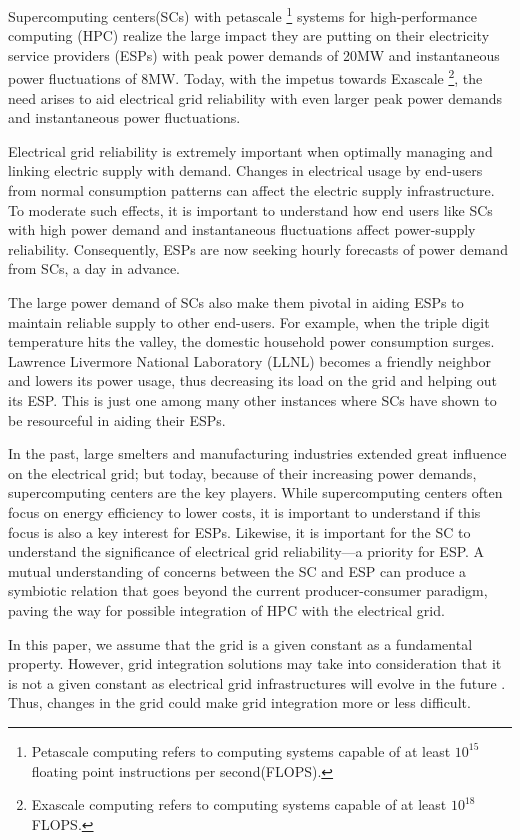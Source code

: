 Supercomputing centers(SCs) with petascale
\footnote{Petascale computing refers to computing systems capable of at
least \(10^{15}\) floating point instructions per second(FLOPS).} 
systems for high-performance computing (HPC) realize the large 
impact they are putting on their electricity service providers (ESPs) with peak 
power demands of 20MW and instantaneous power fluctuations of 8MW. 
Today, with the impetus towards Exascale
\footnote{Exascale computing refers to computing systems capable of at
least \(10^{18}\)FLOPS.}, 
the need arises to
aid electrical grid reliability  with even larger peak power demands and 
instantaneous power fluctuations.

Electrical grid reliability is extremely important when optimally managing and 
linking electric supply with demand. Changes in electrical usage by end-users from normal 
consumption patterns can affect the electric supply infrastructure. 
To moderate such effects, it is important to understand how end users like SCs with 
high power demand and instantaneous fluctuations
affect power-supply reliability. 
Consequently, ESPs are now seeking hourly forecasts of power demand from SCs, a day in advance.

The large power demand of SCs also make them pivotal in  
aiding ESPs to maintain reliable supply to other end-users. 
For example, when the triple digit temperature hits the valley,
the domestic household power consumption surges. 
Lawrence Livermore National Laboratory (LLNL) becomes a friendly neighbor and 
lowers its power usage, thus decreasing its load on the grid and helping out its ESP.
This is just one among many other instances where SCs have shown to be  
resourceful in aiding their ESPs.

In the past, large smelters and manufacturing industries extended 
great influence on the electrical grid; but today, because of their increasing power demands,
supercomputing centers are the key players.
While supercomputing centers often focus on energy efficiency to lower costs, 
it is important to understand if this focus is also a key interest for ESPs.
Likewise, it is important for the SC to understand the significance of electrical grid 
reliability---a priority for ESP. 
A mutual understanding of concerns between the SC and ESP can 
produce a symbiotic relation that goes beyond the current producer-consumer 
paradigm, paving the way for possible integration of HPC with the electrical grid.

In this paper, we assume that the grid is a given constant as a fundamental property. However, grid integration solutions may take into consideration that it is not a given constant as electrical grid infrastructures will evolve in the future \cite{he_architecture_2008}. Thus, changes in the grid could make grid integration more or less difficult.


